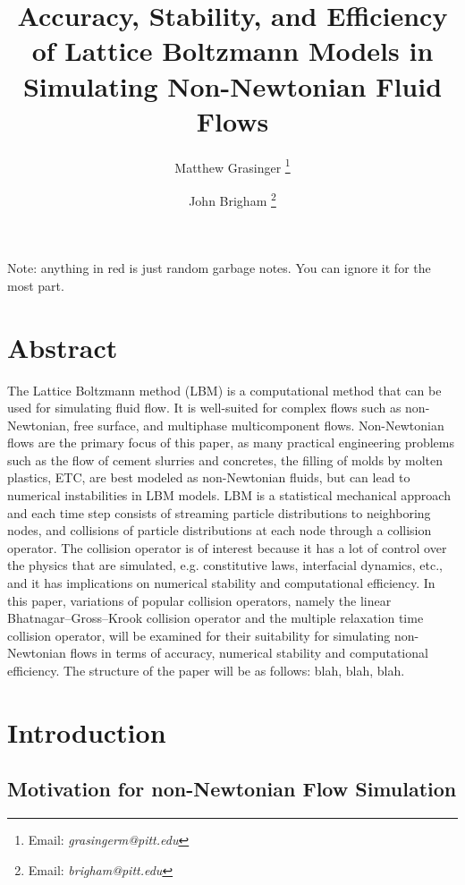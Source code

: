 \documentclass{article}
\title{Accuracy, Stability, and Efficiency of Lattice Boltzmann Models in Simulating Non-Newtonian Fluid Flows}
\author{{Matthew Grasinger}
\thanks{Email: \textit{grasingerm@pitt.edu}}}
\author{John Brigham
\thanks{Email: \textit{brigham@pitt.edu}}}
\affil{Civil and Environmental Engineering Department, University of Pittsburgh}
\begin{document}
\maketitle
\newpage
\tableofcontents
\newpage
{}

\linenumbers

Note: anything in {\color{red}red} is just random garbage notes.
You can ignore it for the most part.

\section*{Abstract}

The Lattice Boltzmann method (LBM) is a computational method that can be used for simulating fluid flow.
It is well-suited for complex flows such as non-Newtonian, free surface, and multiphase multicomponent flows.
Non-Newtonian flows are the primary focus of this paper, as many practical engineering problems such as the flow of cement slurries and concretes, the filling of molds by molten plastics, ETC, are best modeled as non-Newtonian fluids, but can lead to numerical instabilities in LBM models.
LBM is a statistical mechanical approach and each time step consists of streaming particle distributions to neighboring nodes, and collisions of particle distributions at each node through a collision operator.
The collision operator is of interest because it has a lot of control over the physics that are simulated, e.g. constitutive laws, interfacial dynamics, etc., and it has implications on numerical stability and computational efficiency.
In this paper, variations of popular collision operators, namely the linear Bhatnagar--Gross--Krook collision operator and the multiple relaxation time collision operator, will be examined for their suitability for simulating non-Newtonian flows in terms of accuracy, numerical stability and computational efficiency.
The structure of the paper will be as follows: blah, blah, blah.

\section{Introduction} %

\subsection{Motivation for non-Newtonian Flow Simulation}
\end{document}
